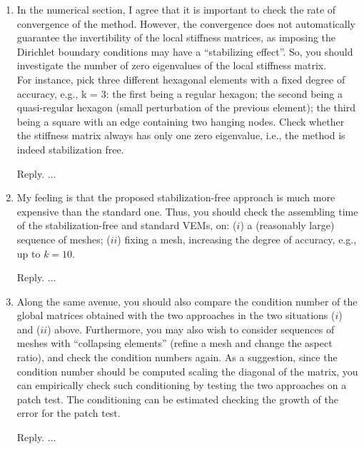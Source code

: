 \documentclass[10pt]{amsart}
\theoremstyle{definition}
\theoremstyle{remark}
\begin{document}
\begin{enumerate}[1.]
\item \textsf{In the numerical section, I agree that it is important to check the rate of convergence of the method.
However, the convergence does not automatically guarantee the invertibility of the local stiffness matrices, as imposing the Dirichlet boundary conditions may have a “stabilizing effect”. So, you should investigate the number of zero eigenvalues of the local stiffness matrix.\\
For instance, pick three different hexagonal elements with a fixed degree of accuracy, e.g., k = 3: the first being a regular hexagon; the second being a quasi-regular hexagon (small perturbation of the previous element); the third being a square with an edge containing two hanging nodes. Check whether the stiffness matrix always has only one zero eigenvalue, i.e., the method is indeed stabilization free.}

\smallskip \noindent \textcolor[rgb]{1.00,0.00,0.00}{Reply.}
...

\medskip

\item \textsf{My feeling is that the proposed stabilization-free approach is much more expensive than the standard one. Thus, you should check the assembling time of the stabilization-free and standard VEMs, on: ($i$) a (reasonably large) sequence of meshes; ($ii$) fixing a mesh, increasing the degree of accuracy, e.g., up to $k = 10$.}

\smallskip \noindent \textcolor[rgb]{1.00,0.00,0.00}{Reply.}
...

\medskip

\item \textsf{Along the same avenue, you should also compare the condition number of the global matrices obtained with the two approaches in the two situations ($i$) and ($ii$) above. Furthermore, you may also wish to consider sequences of meshes with “collapsing elements” (refine a mesh and change the aspect ratio), and check the condition numbers again. As a suggestion, since the condition number should be computed scaling the diagonal of the matrix, you can empirically check such conditioning by testing the two approaches on a patch test. The conditioning can be estimated checking the growth of the error for the patch test.}

\smallskip \noindent \textcolor[rgb]{1.00,0.00,0.00}{Reply.}
...

\medskip


\end{enumerate}
\end{document}
